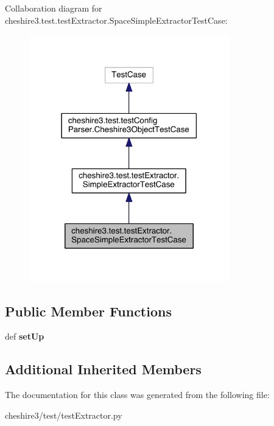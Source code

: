 Collaboration diagram for cheshire3.\-test.\-test\-Extractor.\-Space\-Simple\-Extractor\-Test\-Case\-:
\nopagebreak
\begin{figure}[H]
\begin{center}
\leavevmode
\includegraphics[width=246pt]{classcheshire3_1_1test_1_1test_extractor_1_1_space_simple_extractor_test_case__coll__graph}
\end{center}
\end{figure}
\subsection*{Public Member Functions}
\begin{DoxyCompactItemize}
\item 
\hypertarget{classcheshire3_1_1test_1_1test_extractor_1_1_space_simple_extractor_test_case_a64599c9139ae60dbf73768df647c7870}{def {\bfseries set\-Up}}\label{classcheshire3_1_1test_1_1test_extractor_1_1_space_simple_extractor_test_case_a64599c9139ae60dbf73768df647c7870}

\end{DoxyCompactItemize}
\subsection*{Additional Inherited Members}


The documentation for this class was generated from the following file\-:\begin{DoxyCompactItemize}
\item 
cheshire3/test/test\-Extractor.\-py\end{DoxyCompactItemize}
